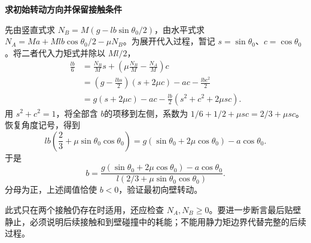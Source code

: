 \begin{solution}
\par\medskip{}\noindent\textbf{求初始转动方向并保留接触条件}\par\nobreak
先由竖直式求 $N_B=M(g-lb\sin\theta_0/2)$，由水平式求 $N_A=Ma+Mlb\cos\theta_0/2-\mu N_B$。为展开代入过程，暂记 $s=\sin\theta_0$、$c=\cos\theta_0$。将二者代入力矩式并除以 $Ml/2$，
\begin{align*}
 \frac{lb}{6}
 &=\frac{N_B}{M}s+\left(\mu\frac{N_B}{M}-\frac{N_A}{M}\right)c\\
 &=\left(g-\frac{lb s}{2}\right)(s+2\mu c)-ac-\frac{lb c^2}{2}\\
 &=g(s+2\mu c)-ac-\frac{lb}{2}(s^2+c^2+2\mu sc).
\end{align*}
用 $s^2+c^2=1$，将全部含 $b$的项移到左侧，系数为 $1/6+1/2+\mu sc=2/3+\mu sc$。恢复角度记号，得到
\[
lb\left(\frac23+\mu\sin\theta_0\cos\theta_0\right)
=g(\sin\theta_0+2\mu\cos\theta_0)-a\cos\theta_0.
\]
于是
\[
 b=\frac{g(\sin\theta_0+2\mu\cos\theta_0)-a\cos\theta_0}
 {l(2/3+\mu\sin\theta_0\cos\theta_0)}.
\]
分母为正，上述阈值恰使 $b<0$，验证最初向壁转动。

此式只在两个接触仍存在时适用，还应检查 $N_A,N_B\ge0$。要进一步断言最后贴壁静止，必须说明后续接触和到壁碰撞中的耗能；不能用静力矩边界代替完整的后续过程。
\end{solution}

